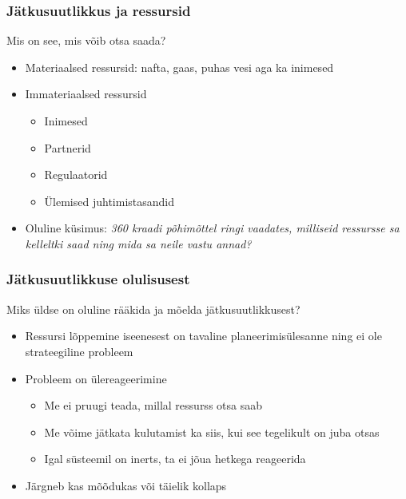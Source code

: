 \begin{frame}[fragile]
  \frametitle{Jätkusuutlikkus ja ressursid}
	Mis on see, mis võib otsa saada?

	\begin{itemize}
		\item Materiaalsed ressursid: nafta, gaas, puhas vesi aga ka inimesed
		\item Immateriaalsed ressursid
			\begin{itemize}
				\item Inimesed
				\item Partnerid
				\item Regulaatorid
				\item Ülemised juhtimistasandid
			\end{itemize}		
		\item Oluline küsimus: \emph{360 kraadi põhimõttel ringi vaadates, milliseid ressursse sa kelleltki saad ning mida sa neile vastu annad?}
	\end{itemize}
\end{frame}

\begin{frame}[fragile]
  \frametitle{Jätkusuutlikkuse olulisusest}
	Miks üldse on oluline rääkida ja mõelda jätkusuutlikkusest?

	\begin{itemize}
		\item Ressursi lõppemine iseenesest on tavaline planeerimisülesanne ning ei ole strateegiline probleem
		\item Probleem on ülereageerimine
			\begin{itemize}
				\item Me ei pruugi teada, millal ressurss otsa saab
				\item Me võime jätkata kulutamist ka siis, kui see tegelikult on juba otsas
				\item Igal süsteemil on inerts, ta ei jõua hetkega reageerida
			\end{itemize}		
		\item Järgneb kas mõõdukas või täielik kollaps
	\end{itemize}
\end{frame}


